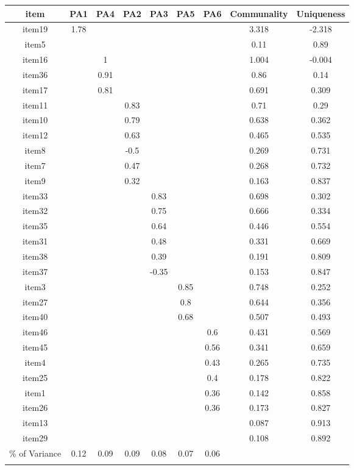 \begin{appendix}
\begin{table}[tbp]
\begin{center}
\begin{threeparttable}
{\begin{tabular}{ccccccccc}
\toprule
item & \multicolumn{1}{c}{PA1} & \multicolumn{1}{c}{PA4} & \multicolumn{1}{c}{PA2} & \multicolumn{1}{c}{PA3} & \multicolumn{1}{c}{PA5} & \multicolumn{1}{c}{PA6} & \multicolumn{1}{c}{Communality} & \multicolumn{1}{c}{Uniqueness}\\
\midrule
item19 & 1.78 &  &  &  &  &  & 3.318 & -2.318\\
item5 &  &  &  &  &  &  & 0.11 & 0.89\\
item16 &  & 1 &  &  &  &  & 1.004 & -0.004\\
item36 &  & 0.91 &  &  &  &  & 0.86 & 0.14\\
item17 &  & 0.81 &  &  &  &  & 0.691 & 0.309\\
item11 &  &  & 0.83 &  &  &  & 0.71 & 0.29\\
item10 &  &  & 0.79 &  &  &  & 0.638 & 0.362\\
item12 &  &  & 0.63 &  &  &  & 0.465 & 0.535\\
item8 &  &  & -0.5 &  &  &  & 0.269 & 0.731\\
item7 &  &  & 0.47 &  &  &  & 0.268 & 0.732\\
item9 &  &  & 0.32 &  &  &  & 0.163 & 0.837\\
item33 &  &  &  & 0.83 &  &  & 0.698 & 0.302\\
item32 &  &  &  & 0.75 &  &  & 0.666 & 0.334\\
item35 &  &  &  & 0.64 &  &  & 0.446 & 0.554\\
item31 &  &  &  & 0.48 &  &  & 0.331 & 0.669\\
item38 &  &  &  & 0.39 &  &  & 0.191 & 0.809\\
item37 &  &  &  & -0.35 &  &  & 0.153 & 0.847\\
item3 &  &  &  &  & 0.85 &  & 0.748 & 0.252\\
item27 &  &  &  &  & 0.8 &  & 0.644 & 0.356\\
item40 &  &  &  &  & 0.68 &  & 0.507 & 0.493\\
item46 &  &  &  &  &  & 0.6 & 0.431 & 0.569\\
item45 &  &  &  &  &  & 0.56 & 0.341 & 0.659\\
item4 &  &  &  &  &  & 0.43 & 0.265 & 0.735\\
item25 &  &  &  &  &  & 0.4 & 0.178 & 0.822\\
item1 &  &  &  &  &  & 0.36 & 0.142 & 0.858\\
item26 &  &  &  &  &  & 0.36 & 0.173 & 0.827\\
item13 &  &  &  &  &  &  & 0.087 & 0.913\\
item29 &  &  &  &  &  &  & 0.108 & 0.892\\
\% of Variance & 0.12 & 0.09 & 0.09 & 0.08 & 0.07 & 0.06 &  & \\
\bottomrule
\addlinespace
\end{tabular}

}
\end{threeparttable}
\end{center}
\end{table}
\end{appendix}
